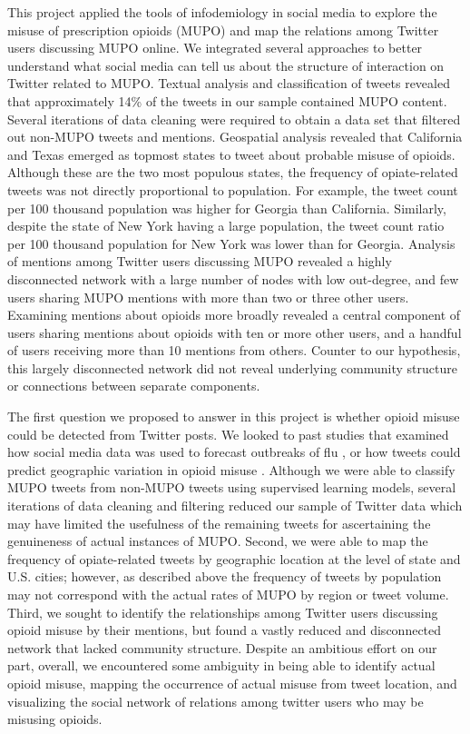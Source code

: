 \documentclass[sigconf]{acmart}
\begin{document}
This project applied the tools of infodemiology in social media to explore the 
misuse of prescription opioids (MUPO) and map the relations among Twitter 
users discussing MUPO online. We integrated several approaches to better 
understand what social media can tell us about the structure of interaction on 
Twitter related to MUPO. Textual analysis and classification of tweets revealed 
that approximately 14\% of the tweets in our sample contained MUPO content. 
Several iterations of data cleaning were required to obtain a data set that 
filtered out non-MUPO tweets and mentions. Geospatial analysis revealed that 
California and Texas emerged as topmost states to tweet about probable misuse
of opioids. Although these are the two most populous states, the frequency of 
opiate-related tweets was not directly proportional to population. For example, 
the tweet count per 100 thousand population was higher for Georgia than 
California. Similarly, despite the state of New York having a large population, 
the tweet count ratio per 100 thousand population for New York was lower than 
for Georgia. Analysis of mentions among Twitter users discussing MUPO revealed 
a highly disconnected network with a large number of nodes with low out-degree, 
and few users sharing MUPO mentions with more than two or three other users. 
Examining mentions about opioids more broadly revealed a central component of 
users sharing mentions about opioids with ten or more other users, and a 
handful of users receiving more than 10 mentions from others. Counter to 
our hypothesis, this largely disconnected network did not reveal underlying 
community structure or connections between separate components. 


The first question we proposed to answer in this project is whether opioid 
misuse could be detected from Twitter posts. We looked to past studies that 
examined how social media data was used to forecast outbreaks of flu 
\cite{culotta10, paul14}, or how tweets could predict geographic variation 
in opioid misuse \cite{chary17, sarker16}. Although we were able to classify 
MUPO tweets from non-MUPO tweets using supervised learning models, several 
iterations of data cleaning and filtering reduced our sample of Twitter data
which may have limited the usefulness of the remaining tweets for ascertaining
the genuineness of actual instances of MUPO. Second, we were able to map
the frequency of opiate-related tweets by geographic location at the level 
of state and U.S. cities; however, as described above the frequency of tweets
by population may not correspond with the actual rates of MUPO by region or 
tweet volume. Third, we sought to identify the relationships among Twitter 
users discussing opioid misuse by their mentions, but found a vastly reduced 
and disconnected network that lacked community structure. Despite an ambitious 
effort on our part, overall, we encountered some ambiguity in being able to 
identify actual opioid misuse, mapping the occurrence of actual misuse from 
tweet location, and visualizing the social network of relations among twitter 
users who may be misusing opioids.
\end{document}

